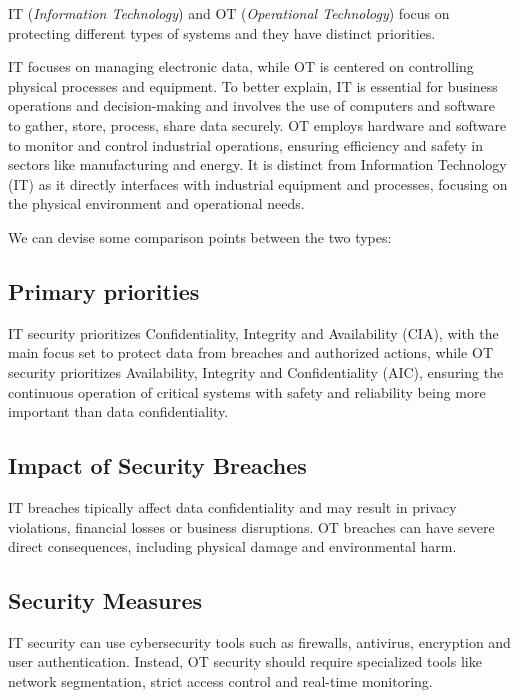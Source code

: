 IT (\textit{Information Technology}) and OT (\textit{Operational Technology}) focus on protecting different types of systems and they have distinct priorities.

IT focuses on managing electronic data, while OT is centered on controlling physical processes and equipment. To better explain, IT is essential for business operations and decision-making and involves the use of computers and software to gather, store, process, share data securely. OT employs hardware and software to monitor and control industrial operations, ensuring efficiency and safety in sectors like manufacturing and energy. It is distinct from Information Technology (IT) as it directly interfaces with industrial equipment and processes, focusing on the physical environment and operational needs.~\cite{paloalto-it-ot-diff}

We can devise some comparison points between the two types:

\subsection{Primary priorities}

IT security prioritizes Confidentiality, Integrity and Availability (CIA), with the main focus set to protect data from breaches and authorized actions, while OT security prioritizes Availability, Integrity and Confidentiality (AIC), ensuring the continuous operation of critical systems with safety and reliability being more important than data confidentiality.

\subsection{Impact of Security Breaches}

IT breaches tipically affect data confidentiality and may result in privacy violations, financial losses or business disruptions. OT breaches can have severe direct consequences, including physical damage and environmental harm.

\subsection{Security Measures}

IT security can use cybersecurity tools such as firewalls, antivirus, encryption and user authentication. Instead, OT security should require specialized tools like network segmentation, strict access control and real-time monitoring.

